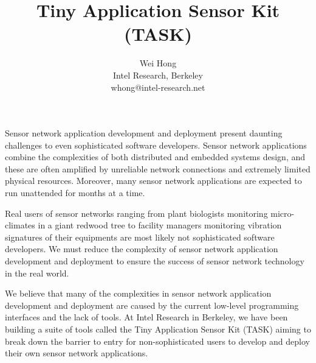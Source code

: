 \documentclass[10pt,letterpaper]{article}
\begin{document}
\title{Tiny Application Sensor Kit (TASK)}

\author{Wei Hong \\
Intel Research, Berkeley \\
whong@intel-research.net}

\date{}

\maketitle

Sensor network application development and deployment present daunting 
challenges to even sophisticated software developers.  Sensor network 
applications combine the complexities of both distributed and embedded 
systems design, and these are often amplified by unreliable network 
connections and extremely limited physical resources.  Moreover, many 
sensor network applications are expected to run unattended for months at a time.

Real users of sensor networks ranging from plant biologists monitoring
micro-climates in a giant redwood tree to facility managers monitoring
vibration signatures of their equipments are most likely not sophisticated
software developers.  We must reduce the complexity of sensor network
application development and deployment to ensure the success of sensor
network technology in the real world.

We believe that many of the complexities in sensor network application
development and deployment are caused by the current low-level
programming interfaces and the lack of tools.  At Intel Research
in Berkeley, we have been building a suite of tools called the Tiny Application
Sensor Kit (TASK) aiming to break down the barrier to entry for
non-sophisticated users to develop and deploy their own sensor network
applications.
\end{document}
